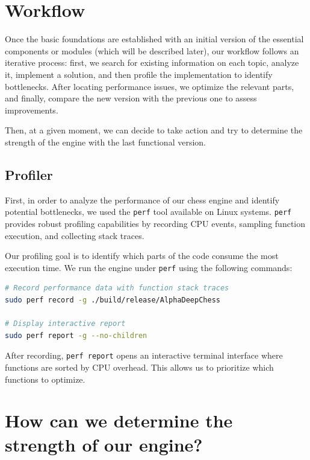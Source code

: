 \section{Workflow}

Once the basic foundations are established with an initial version of the essential components or modules (which will be described later), our workflow follows an iterative process: first, we search for existing information on each topic, analyze it, implement a solution, and then profile the implementation to identify bottlenecks. After locating performance issues, we optimize the relevant parts, and finally, compare the new version with the previous one to assess improvements.

\vspace{1em}

\noindent Then, at a given moment, we can decide to take action and try to determine the strength of the engine with the last functional version.

\subsection{Profiler}

First, in order to analyze the performance of our chess engine and identify potential bottlenecks, we used the \texttt{perf} tool available on Linux systems. \texttt{perf} provides robust profiling capabilities by recording CPU events, sampling function execution, and collecting stack traces.

\vspace{1em}

\noindent Our profiling goal is to identify which parts of the code consume the most execution time. We run the engine under \texttt{perf} using the following commands:

\begin{lstlisting}[language=bash, caption={Profiling AlphaDeepChess with perf}, frame=single, breaklines=true]
# Record performance data with function stack traces
sudo perf record -g ./build/release/AlphaDeepChess

# Display interactive report
sudo perf report -g --no-children
\end{lstlisting}

\noindent After recording, \texttt{perf report} opens an interactive terminal interface where functions are sorted by CPU overhead. This allows us to prioritize which functions to optimize.

\section{How can we determine the strength of our engine?}

